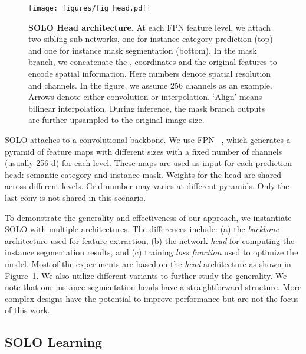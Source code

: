 \documentclass[runningheads]{llncs}
\def\method{{SOLO}\xspace}
\def\OurMethod{{SOLO}\xspace}
\begin{document}
\begin{figure}[t!]
\begin{center}
    \texttt{[image: figures/fig\_head.pdf]}
\end{center}
   \caption{\textbf{\method Head architecture}. At each FPN feature level, we attach two sibling sub-networks, one for instance category prediction (top) and one for instance mask segmentation (bottom).
   In the mask branch, we concatenate the ,  coordinates and the original features to
encode spatial information.
   Here numbers denote spatial resolution and channels.
   In the figure, we assume 256 channels as an example.
   Arrows denote either convolution or interpolation.
`Align' means
bilinear interpolation.
During inference, the mask branch outputs
are
   further upsampled to the original image size.}
\label{fig:head}
\end{figure}



\OurMethod attaches to a convolutional backbone.
We use FPN ~\cite{fpn}, which generates a pyramid of feature maps with different sizes with  a  fixed number of channels (usually 256-d) for each level. These maps are used as input for each prediction head: semantic category and instance mask. Weights for the head are shared across different levels. Grid number may varies at different pyramids.  Only the last conv is not shared in this scenario.






To demonstrate the generality and effectiveness of our approach, we instantiate \method with multiple architectures. The differences include: (a) the \textit{backbone} architecture used for feature extraction, (b) the network \textit{head} for computing the instance segmentation results, and (c) training \textit{loss function} used to optimize the model. Most of the experiments are based on the \textit{head} architecture as shown in Figure~\ref{fig:head}. We also utilize different variants to further study the generality. We note that our instance segmentation heads have a straightforward structure. More complex designs have the potential to improve performance but are not the focus of this work.


\subsection{\OurMethod Learning}
\end{document}
